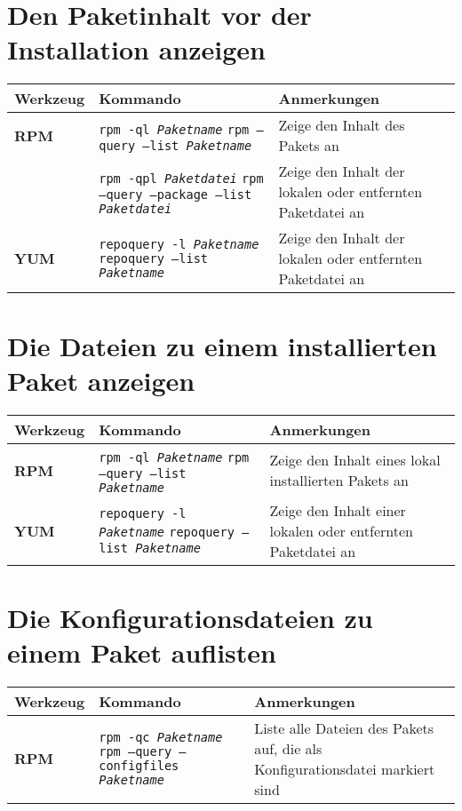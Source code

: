 \documentclass[10pt,a4paper]{article}
\begin{document}
\newpage

\cheatsheet

\section{Den Paketinhalt vor der Installation anzeigen}
\begin{tabular}{ p{3.5cm} p{9cm} p{11cm}}
  \hline
  \rowcolor{Gray}
  \textbf{Werkzeug} & \textbf{Kommando} & \textbf{Anmerkungen} \\
  \hline 
  \textbf{RPM} & \texttt{rpm -ql \textit{Paketname}} \newline \texttt{rpm --query --list \textit{Paketname}} & Zeige den Inhalt des Pakets an\\
  \rowcolor{Gray}
  & \texttt{rpm -qpl \textit{Paketdatei}} \newline \texttt{rpm --query --package --list \textit{Paketdatei}} & Zeige den Inhalt der lokalen oder entfernten Paketdatei an\\
  \textbf{YUM} & \texttt{repoquery -l \textit{Paketname}} \newline \texttt{repoquery --list \textit{Paketname}} & Zeige den Inhalt der lokalen oder entfernten Paketdatei an \\
  \hline
\end{tabular}

\section{Die Dateien zu einem installierten Paket anzeigen}
\begin{tabular}{ p{3.5cm} p{9cm} p{11cm}}
  \hline
  \rowcolor{Gray}
  \textbf{Werkzeug} & \textbf{Kommando} & \textbf{Anmerkungen} \\
  \hline 
  \textbf{RPM} & \texttt{rpm -ql \textit{Paketname}} \newline \texttt{rpm --query --list \textit{Paketname}} & Zeige den Inhalt eines lokal installierten Pakets an\\
  \rowcolor{Gray}
  \textbf{YUM} & \texttt{repoquery -l \textit{Paketname}} \newline \texttt{repoquery --list \textit{Paketname}} & Zeige den Inhalt einer lokalen oder entfernten Paketdatei an \\
  \hline
\end{tabular}

\section{Die Konfigurationsdateien zu einem Paket auflisten}
\begin{tabular}{ p{3.5cm} p{9cm} p{11cm}}
  \hline
  \rowcolor{Gray}
  \textbf{Werkzeug} & \textbf{Kommando} & \textbf{Anmerkungen} \\
  \hline 
  \textbf{RPM} & \texttt{rpm -qc \textit{Paketname}} \newline \texttt{rpm --query --configfiles \textit{Paketname}} & Liste alle Dateien des Pakets auf, die als Konfigurationsdatei markiert sind\\
  \hline
\end{tabular}
\end{document}
